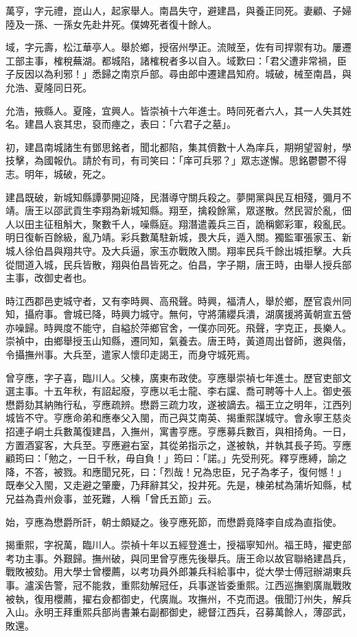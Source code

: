 \begin{pinyinscope}
萬亨，字元禮，崑山人，起家舉人。南昌失守，避建昌，與養正同死。妻顧、子婦陸及一孫、一孫女先赴井死。僕婢死者復十餘人。

域，字元壽，松江華亭人。舉於鄉，授宿州學正。流賊至，佐有司捍禦有功。屢遷工部主事，榷稅蕪湖。都城陷，諸榷稅者多以自入。域歎曰：「君父遭非常禍，臣子反因以為利邪！」悉歸之南京戶部。尋由郎中遷建昌知府。城破，械至南昌，與允浩、夏隆同日死。

允浩，掖縣人。夏隆，宜興人。皆崇禎十六年進士。時同死者六人，其一人失其姓名。建昌人哀其忠，裒而瘞之，表曰：「六君子之墓」。

初，建昌南城諸生有鄧思銘者，聞北都陷，集其儕數十人為庠兵，期朔望習射，學技擊，為國報仇。請於有司，有司笑曰：「庠可兵邪？」眾志遂懈。思銘鬱鬱不得志。明年，城破，死之。

建昌既破，新城知縣譚夢開迎降，民潛導守關兵殺之。夢開黨與民互相殘，彌月不靖。唐王以邵武貢生李翔為新城知縣。翔至，擒殺餘黨，眾遂散。然民習於亂，佃人以田主征租斛大，聚數千人，噪縣庭。翔潛遣義兵三百，詭稱鄭彩軍，殺亂民。明日復斬百餘級，亂乃靖。彩兵數萬駐新城，畏大兵，遁入關。獨監軍張家玉、新城人徐伯昌與翔共守。及大兵逼，家玉亦戰敗入關。翔率民兵千餘出城拒擊。大兵從間道入城，民兵皆散，翔與伯昌皆死之。伯昌，字子期，唐王時，由舉人授兵部主事，改御史者也。

時江西郡邑吏城守者，又有李時興、高飛聲。時興，福清人，舉於鄉，歷官袁州同知，攝府事。會城已降，時興力城守。無何，守將蒲纓兵潰，湖廣援將黃朝宣五營亦噪歸。時興度不能守，自縊於萍鄉官舍，一僕亦同死。飛聲，字克正，長樂人。崇禎中，由鄉舉授玉山知縣，遷同知，氣養去。唐王時，黃道周出督師，邀與偕，令攝撫州事。大兵至，遣家人懷印走謁王，而身守城死焉。

曾亨應，字子喜，臨川人。父棟，廣東布政使。亨應舉崇禎七年進士。歷官吏部文選主事。十五年秋，有詔起廢，亨應以毛士龍、李右讜、喬可聘等十人上。御史張懋爵劾其納賄行私，亨應疏辨。懋爵三疏力攻，遂被謫去。福王立之明年，江西列城皆不守。亨應命弟和應奉父入閩，而己與艾南英、揭重熙謀城守。會永寧王慈炎招連子峒土兵數萬復建昌，入撫州，寓書亨應。亨應募兵數百，與相掎角。一日，方置酒宴客，大兵至。亨應避右室，其從弟指示之，遂被執，并執其長子筠。亨應顧筠曰：「勉之，一日千秋，毋自負！」筠曰：「諾。」先受刑死。釋亨應縛，諭之降，不答，被戮。和應聞兄死，曰：「烈哉！兄為忠臣，兄子為孝子，復何憾！」既奉父入閩，又走避之肇慶，乃拜辭其父，投井死。先是，棟弟栻為蒲圻知縣，栻兄益為貴州僉事，並死難，人稱「曾氏五節」云。

始，亨應為懋爵所訐，朝士頗疑之。後亨應死節，而懋爵竟降李自成為直指使。

揭重熙，字祝萬，臨川人。崇禎十年以五經登進士，授福寧知州。福王時，擢吏部考功主事。外艱歸。撫州破，與同里曾亨應先後舉兵。唐王命以故官聯絡建昌兵，戰敗被劾。用大學士曾櫻薦，以考功員外郎兼兵科給事中，從大學士傅冠辦湖東兵事。瀘溪告警，冠不能救，重熙劾解冠任，兵事遂皆委重熙。江西巡撫劉廣胤戰敗被執，復用櫻薦，擢右僉都御史，代廣胤。攻撫州，不克而退。俄聞汀州失，解兵入山。永明王拜重熙兵部尚書兼右副都御史，總督江西兵，召募萬餘人，薄邵武，敗還。


\end{pinyinscope}
